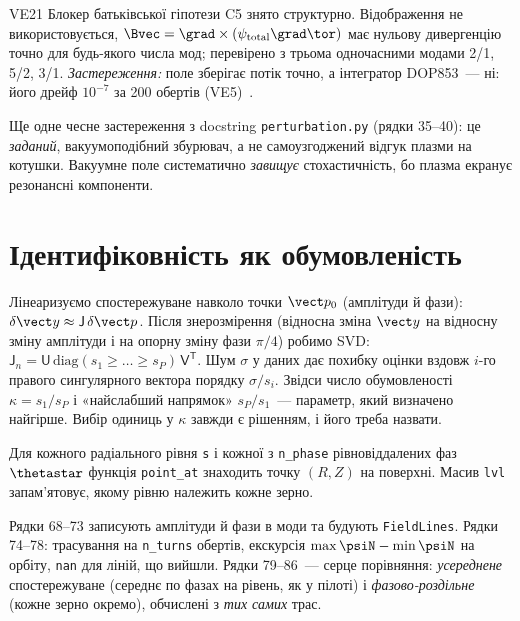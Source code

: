 \begin{established}{VE21}
Блокер батьківської гіпотези C5 знято структурно. Відображення не використовується, $\Bvec=\grad\times(\psi_{\mathrm{total}}\grad\tor)$ має нульову дивергенцію точно для будь-якого числа мод; перевірено з трьома одночасними модами 2/1, 5/2, 3/1. \emph{Застереження:} поле зберігає потік точно, а інтегратор DOP853~--- ні: його дрейф $10^{-7}$ за 200 обертів (VE5)~\cite{RegViz}.
\end{established}

Ще одне чесне застереження з docstring \texttt{perturbation.py} (рядки 35--40): це \emph{заданий}, вакуумоподібний збурювач, а не самоузгоджений відгук плазми на котушки. Вакуумне поле систематично \emph{завищує} стохастичність, бо плазма екранує резонансні компоненти.

\section{Ідентифіковність як обумовленість}\label{sec:g07-cond}

\begin{outofcorpus}
Лінеаризуємо спостережуване навколо точки $\vect p_0$ (амплітуди й фази): $\delta\vect y\approx\mathsf J\,\delta\vect p$. Після знерозмірення (відносна зміна $\vect y$ на відносну зміну амплітуди і на опорну зміну фази $\pi/4$) робимо SVD: $\mathsf J_n=\mathsf U\,\mathrm{diag}(s_1\ge\dots\ge s_P)\,\mathsf V^{\mathsf T}$. Шум $\sigma$ у даних дає похибку оцінки вздовж $i$-го правого сингулярного вектора порядку $\sigma/s_i$. Звідси число обумовленості $\kappa=s_1/s_P$ і «найслабший напрямок» $s_P/s_1$~--- параметр, який визначено найгірше. Вибір одиниць у $\kappa$ завжди є рішенням, і його треба назвати.
\end{outofcorpus}


Для кожного радіального рівня \texttt{s} і кожної з \texttt{n\_phase} рівновіддалених фаз $\thetastar$ функція \texttt{point\_at} знаходить точку $(R,Z)$ на поверхні. Масив \texttt{lvl} запам'ятовує, якому рівню належить кожне зерно.


Рядки 68--73 записують амплітуди й фази в моди та будують \texttt{FieldLines}. Рядки 74--78: трасування на \texttt{n\_turns} обертів, екскурсія $\max\psiN-\min\psiN$ на орбіту, \texttt{nan} для ліній, що вийшли. Рядки 79--86~--- серце порівняння: \emph{усереднене} спостережуване (середнє по фазах на рівень, як у пілоті) і \emph{фазово-роздільне} (кожне зерно окремо), обчислені з \emph{тих самих} трас.

